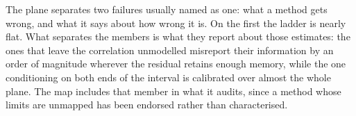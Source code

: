 The plane separates two failures usually named as one: what a method gets wrong, and what it says
about how wrong it is. On the first the ladder is nearly flat. What separates the members
is what they report about those estimates: the ones that leave the correlation unmodelled
misreport their information by an order of magnitude wherever the residual retains enough memory,
while the one conditioning on both ends of the interval is calibrated over almost the whole plane.
The map includes that member in what it audits, since a method whose limits are
unmapped has been endorsed rather than characterised.


